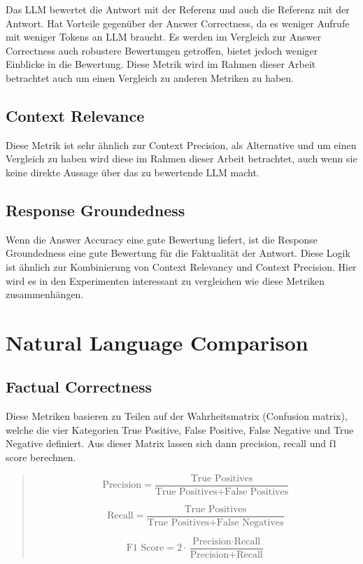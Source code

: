 Das LLM bewertet die Antwort mit der Referenz und auch die Referenz mit der Antwort.
Hat Vorteile gegenüber der Answer Correctness, da es weniger Aufrufe mit weniger Tokens an LLM braucht.
Es werden im Vergleich zur Answer Correctness auch robustere Bewertungen getroffen, bietet jedoch weniger Einblicke in die Bewertung.
Diese Metrik wird im Rahmen dieser Arbeit betrachtet auch um einen Vergleich zu anderen Metriken zu haben.

\subsection{Context Relevance}
Diese Metrik ist sehr ähnlich zur Context Precision, als Alternative und um einen Vergleich zu haben wird diese im Rahmen dieser Arbeit betrachtet, auch wenn sie keine direkte Aussage über das zu bewertende LLM macht.

\subsection{Response Groundedness}
Wenn die Answer Accuracy eine gute Bewertung liefert, ist die Response Groundedness eine gute Bewertung für die Faktualität der Antwort.
Diese Logik ist ähnlich zur Kombinierung von Context Relevancy und Context Precision.
Hier wird es in den Experimenten interessant zu vergleichen wie diese Metriken zusammenhängen.
\section{Natural Language Comparison}

\subsection{Factual Correctness}
Diese Metriken basieren zu Teilen auf der Wahrheitsmatrix (Confusion matrix), welche die vier Kategorien True Positive, False Positive, False Negative und True Negative definiert.\cite{wikipedia_confusion_matrix}
Aus dieser Matrix lassen sich dann precision, recall und f1 score berechnen.

\begin{quote}
\begin{equation}
  \label{eq:precision}
  \text{Precision} = \frac{\text{True Positives}}{\text{True Positives} + \text{False Positives}}
\end{equation}

\begin{equation}
  \label{eq:recall}
  \text{Recall} = \frac{\text{True Positives}}{\text{True Positives} + \text{False Negatives}}
\end{equation}

\begin{equation}
  \label{eq:f1_score}
  \text{F1 Score} = 2 \cdot \frac{\text{Precision} \cdot \text{Recall}}{\text{Precision} + \text{Recall}}
\end{equation}
\cite{wikipedia_confusion_matrix}
\end{quote}

